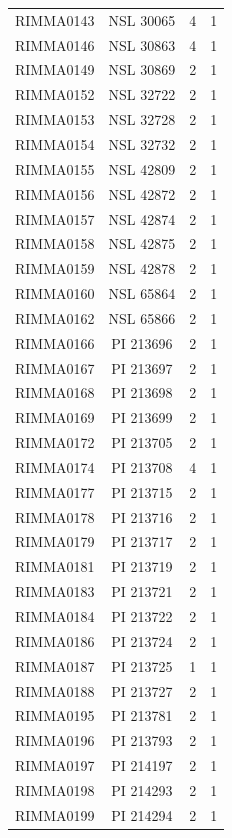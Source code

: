 \documentclass[11pt]{article}
\newcounter{rowno}
\begin{document}
\begin{scriptsize}
\begin{longtable}{>{\stepcounter{rowno}}cccc}
    RIMMA0143 & NSL	30065 & 4     & 1 \\
    RIMMA0146 & NSL	30863 & 4     & 1 \\
    RIMMA0149 & NSL	30869 & 2     & 1 \\
    RIMMA0152 & NSL	32722 & 2     & 1 \\
    RIMMA0153 & NSL	32728 & 2     & 1 \\
    RIMMA0154 & NSL	32732 & 2     & 1 \\
    RIMMA0155 & NSL	42809 & 2     & 1 \\
    RIMMA0156 & NSL	42872 & 2     & 1 \\
    RIMMA0157 & NSL	42874 & 2     & 1 \\
    RIMMA0158 & NSL	42875 & 2     & 1 \\
    RIMMA0159 & NSL	42878 & 2     & 1 \\
    RIMMA0160 & NSL	65864 & 2     & 1 \\
    RIMMA0162 & NSL	65866 & 2     & 1 \\
    RIMMA0166 & PI	213696 & 2     & 1 \\
    RIMMA0167 & PI	213697 & 2     & 1 \\
    RIMMA0168 & PI	213698 & 2     & 1 \\
    RIMMA0169 & PI	213699 & 2     & 1 \\
    RIMMA0172 & PI	213705 & 2     & 1 \\
    RIMMA0174 & PI	213708 & 4     & 1 \\
    RIMMA0177 & PI	213715 & 2     & 1 \\
    RIMMA0178 & PI	213716 & 2     & 1 \\
    RIMMA0179 & PI	213717 & 2     & 1 \\
    RIMMA0181 & PI	213719 & 2     & 1 \\
    RIMMA0183 & PI	213721 & 2     & 1 \\
    RIMMA0184 & PI	213722 & 2     & 1 \\
    RIMMA0186 & PI	213724 & 2     & 1 \\
    RIMMA0187 & PI	213725 & 1     & 1 \\
    RIMMA0188 & PI	213727 & 2     & 1 \\
    RIMMA0195 & PI	213781 & 2     & 1 \\
    RIMMA0196 & PI	213793 & 2     & 1 \\
    RIMMA0197 & PI	214197 & 2     & 1 \\
    RIMMA0198 & PI	214293 & 2     & 1 \\
    RIMMA0199 & PI	214294 & 2     & 1 \\

\end{longtable}
\end{scriptsize}
\end{document}

